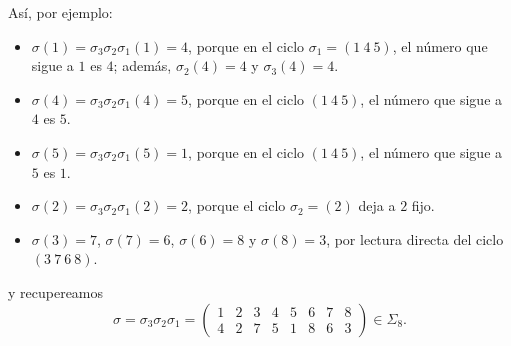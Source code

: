 \noindent Así, por ejemplo:
\begin{itemize}
	\item \(\sigma(1) = \sigma_3\sigma_2\sigma_1(1) = 4\), porque en el ciclo \(\sigma_1 = (1\ 4\ 5)\), el número que sigue a \(1\) es \(4\); además, \(\sigma_2(4) = 4\) y \(\sigma_3(4) = 4\).
	\item \(\sigma(4) = \sigma_3\sigma_2\sigma_1(4) = 5\), porque en el ciclo \((1\ 4\ 5)\), el número que sigue a \(4\) es \(5\).
	\item \(\sigma(5) = \sigma_3\sigma_2\sigma_1(5) = 1\), porque en el ciclo \((1\ 4\ 5)\), el número que sigue a \(5\) es \(1\).
	\item \(\sigma(2) = \sigma_3\sigma_2\sigma_1(2) = 2\), porque el ciclo \(\sigma_2 = (2)\) deja a \(2\) fijo.
	\item \(\sigma(3) = 7\), \(\sigma(7) = 6\), \(\sigma(6) = 8\) y \(\sigma(8) = 3\), por lectura directa del ciclo \((3\ 7\ 6\ 8)\).
\end{itemize}

y recupereamos \[
\sigma =\sigma_3\sigma_2\sigma_1= \left(\begin{array}{cccccccc}
	1 & 2 & 3 & 4 & 5 & 6 & 7 & 8 \\
	4 & 2 & 7 & 5 & 1 & 8 & 6 & 3
\end{array}\right)\in \Sigma_8.
\]


\begin{observacion}
\end{observacion}

\begin{ejemplo}
\end{ejemplo}

